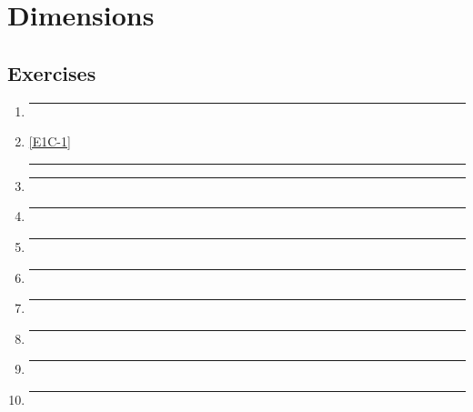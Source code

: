 \section*{Dimensions}
\subsection*{Exercises}

\begin{enumerate}[label=\textbf{\arabic*}]

  \item{
    \label{E1C-1}
    \lipsum[66]
    \bigbreak
    \hrule
    \bigbreak
  }

  \item{
    \ref{E1C-1}
    \lipsum[75]
    \bigbreak
    \hrule
    \bigbreak
  }

  \item{
    \lipsum[74]
    \bigbreak
    \hrule
    \bigbreak
  }

  \item{
    \lipsum[28]
    \bigbreak
    \hrule
    \bigbreak
  }

  \item{
    \lipsum[32]
    \bigbreak
    \hrule
    \bigbreak
  }

  \item{
    \lipsum[27]
    \bigbreak
    \hrule
    \bigbreak
  }

  \item{
    \lipsum[4]
    \bigbreak
    \hrule
    \bigbreak
  }

  \item{
    \lipsum[17]
    \bigbreak
    \hrule
    \bigbreak
  }

  \item{
    \lipsum[6]
    \bigbreak
    \hrule
    \bigbreak
  }

  \item{
    \lipsum[43]
    \bigbreak
    \hrule
    \bigbreak
  }


\end{enumerate}
